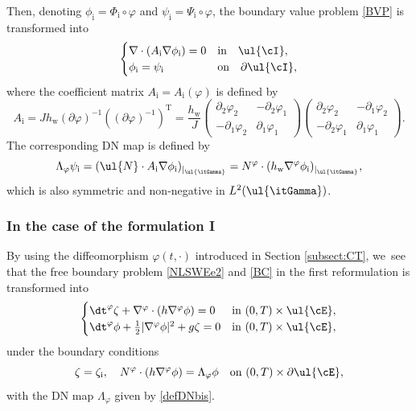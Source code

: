 Then, denoting $\phi_\mathrm{i}=\Phi_\mathrm{i}\circ \varphi$ and $\psi_\mathrm{i}=\Psi_\mathrm{i}\circ\varphi$, the boundary value problem \eqref{BVP} is transformed into
\begin{equation}\label{BVP2}
\begin{cases}
\nabla\cdot(A_\mathrm{i}\nabla\phi_\mathrm{i}) = 0 & \mbox{in} \quad \ul{\cI}, \\
\phi_\mathrm{i} = \psi_\mathrm{i} & \mbox{on} \quad \partial \ul{\cI},
\end{cases}
\end{equation}
where the coefficient matrix $A_\mathrm{i}=A_\mathrm{i}(\varphi)$ is defined by
\[
A_\mathrm{i} = J h_\mathrm{w} (\partial\varphi)^{-1}((\partial\varphi)^{-1})^\mathrm{T}
= \frac{h_\mathrm{w}}{J}
\begin{pmatrix}
\partial_2\varphi_2 & -\partial_2\varphi_1 \\
-\partial_1\varphi_2 & \partial_1\varphi_1
\end{pmatrix}
\begin{pmatrix}
\partial_2\varphi_2 & -\partial_1\varphi_2 \\
-\partial_2\varphi_1 & \partial_1\varphi_1
\end{pmatrix}.
\]
The corresponding DN map is defined by
\begin{equation}\label{defDNbis}
\Lambda_\varphi \psi_\mathrm{i} = (\ul{N}\cdot A_\mathrm{i}\nabla\phi_\mathrm{i})_{\vert_{\ul{\itGamma}}}
= N^\varphi \cdot (h_\mathrm{w} \nabla^\varphi \phi_\mathrm{i})_{\vert_{\ul{\itGamma}}},
\end{equation}
which is also symmetric and non-negative in $L^2(\ul{\itGamma})$.

\subsubsection{In the case of the formulation I}
By using the diffeomorphism $\varphi(t,\cdot)$ introduced in Section \ref{subsect:CT}, we~see that the free boundary problem \eqref{NLSWEe2} and \eqref{BC} in the first reformulation is transformed into
\begin{equation}\label{NLSWEe3}
\begin{cases}
\dt^\varphi \zeta + \nabla^\varphi \cdot (h\nabla^\varphi \phi) = 0 &\text{in } (0,T)\times\ul{\cE}, \\
\dt^\varphi \phi + \frac12|\nabla^\varphi \phi|^2 + g \zeta = 0 &\text{in } (0,T)\times\ul{\cE},
\end{cases}
\end{equation}
under the boundary conditions
\begin{equation}\label{BC2}
\zeta = \zeta_\mathrm{i}, \quad N^\varphi \cdot (h \nabla^\varphi \phi) = \Lambda_\varphi \phi \quad\text{on } (0,T)\times\partial \ul{\cE},
\end{equation}
with the DN map $\Lambda_\varphi$ given by \eqref{defDNbis}.

